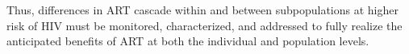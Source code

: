 Thus, differences in ART cascade within and between subpopulations at higher risk of HIV
must be monitored, characterized, and addressed
to fully realize the anticipated benefits of ART
at both the individual and population levels.
\enlargethispage{2ex} %
